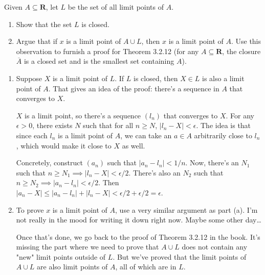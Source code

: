 \documentclass{oxmathproblems}
\begin{document}
\begin{questions}
\miquestion Given $A \subseteq \textbf{R}$, let $L$ be the set of all limit points of $A$.
\begin{enumerate}[label=(\alph*)]
  \item Show that the set $L$ is closed.
  \item Argue that if $x$ is a limit point of $A \cup L$, then $x$ is a limit point of $A$. Use this observation to furnish a proof for Theorem 3.2.12 (for any $A \subseteq \textbf{R}$,
  the closure $\overline{A}$ is a closed set and is the smallest set containing $A$).
\end{enumerate}

\begin{solution}
  \begin{enumerate}[label=(\alph*)]
    \item Suppose $X$ is a limit point of $L$. If $L$ is closed, then $X \in L$ is also a limit point of $A$. That gives an idea of the proof: there's a sequence in $A$ that converges to $X$.
    
    $X$ is a limit point, so there's a sequence $(l_{n})$ that converges to $X$. For any $\epsilon > 0$, there exists $N$ such that for all $n \geq N$, $|l_{n} - X| < \epsilon$. The idea
    is that since each $l_{n}$ is a limit point of $A$, we can take an $a \in A$ arbitrarily close to $l_{n}$, which would make it close to $X$ as well.

    Concretely, construct $(a_{n})$ such that $|a_{n} - l_{n}| < 1/n$. Now, there's an $N_{1}$ such that $n \geq N_{1} \implies |l_{n} - X| < \epsilon/2$. There's also an $N_{2}$
    such that $n \geq N_{2} \implies |a_{n} - l_{n}| < \epsilon/2$. Then $|a_{n} - X| \leq |a_{n} - l_{n}| + |l_{n} - X| < \epsilon/2 + \epsilon/2 = \epsilon$.

    \item To prove $x$ is a limit point of $A$, use a very similar argument as part (a). I'm not really in the mood for writing it down right now. Maybe some other day\dots
    
    Once that's done, we go back to the proof of Theorem 3.2.12 in the book. It's missing the part where we need to prove that $A \cup L$ does not contain any "new" limit points
    outside of $L$. But we've proved that the limit points of $A \cup L$ are also limit points of $A$, all of which are in $L$.
  \end{enumerate}

\end{solution}

\end{questions}
\end{document}
